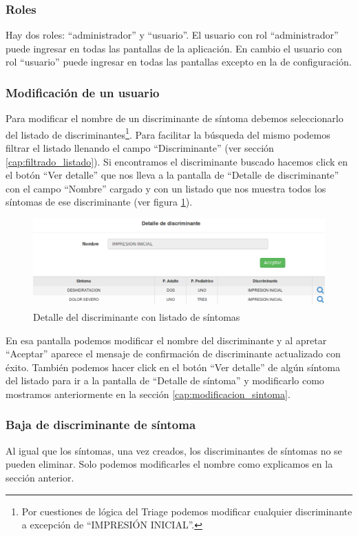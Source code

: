 \subsubsection{Roles}\label{cap:roles}
Hay dos roles: ``administrador'' y ``usuario''. El usuario con rol ``administrador'' puede ingresar en todas las pantallas de la aplicación. En cambio el usuario con rol ``usuario'' puede ingresar en todas las pantallas excepto en la de configuración.

\subsubsection{Modificación de un usuario}
Para modificar el nombre de un discriminante de síntoma debemos seleccionarlo del listado de discriminantes\footnote{Por cuestiones de lógica del Triage podemos modificar cualquier discriminante a excepción de ``IMPRESIÓN INICIAL''.}. Para facilitar la búsqueda del mismo podemos filtrar el listado llenando el campo ``Discriminante'' (ver sección \ref{cap:filtrado_listado}). Si encontramos el discriminante buscado hacemos click en el botón ``Ver detalle'' que nos lleva a la pantalla de ``Detalle de discriminante'' con el campo ``Nombre'' cargado y con un listado que nos muestra todos los síntomas de ese discriminante (ver figura \ref{fig:detalle_discriminante}).
\begin{figure}
\centerline{\includegraphics[width=1\textwidth]{listado_sintomas_de_discriminante.png}}
\caption{Detalle del discriminante con listado de síntomas}
\label{fig:detalle_discriminante}
\end{figure}
En esa pantalla podemos modificar el nombre del discriminante y al apretar ``Aceptar'' aparece el mensaje de confirmación de discriminante actualizado con éxito. También podemos hacer click en el botón ``Ver detalle'' de algún síntoma del listado para ir a la pantalla de ``Detalle de síntoma'' y modificarlo como mostramos anteriormente en la sección \ref{cap:modificacion_sintoma}.

\subsubsection{Baja de discriminante de síntoma}
Al igual que los síntomas, una vez creados, los discriminantes de síntomas no se pueden eliminar. Solo podemos modificarles el nombre como explicamos en la sección anterior.